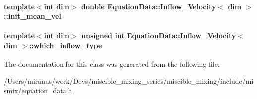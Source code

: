 \paragraph[{init\+\_\+mean\+\_\+vel}]{\setlength{\rightskip}{0pt plus 5cm}template$<$int dim$>$ double {\bf Equation\+Data\+::\+Inflow\+\_\+\+Velocity}$<$ dim $>$\+::init\+\_\+mean\+\_\+vel}\label{class_equation_data_1_1_inflow___velocity_a00fdc2d87172dbf05e274529d53e4874}
\hypertarget{class_equation_data_1_1_inflow___velocity_affb59b1d9b0d574a0aec58652b6dff88}{}
\paragraph[{which\+\_\+inflow\+\_\+type}]{\setlength{\rightskip}{0pt plus 5cm}template$<$int dim$>$ unsigned int {\bf Equation\+Data\+::\+Inflow\+\_\+\+Velocity}$<$ dim $>$\+::which\+\_\+inflow\+\_\+type}\label{class_equation_data_1_1_inflow___velocity_affb59b1d9b0d574a0aec58652b6dff88}


The documentation for this class was generated from the following file\+:\begin{DoxyCompactItemize}
\item 
/\+Users/miranus/work/\+Devs/miscible\+\_\+mixing\+\_\+series/miscible\+\_\+mixing/include/mismix/\hyperlink{equation__data_8h}{equation\+\_\+data.\+h}\end{DoxyCompactItemize}
